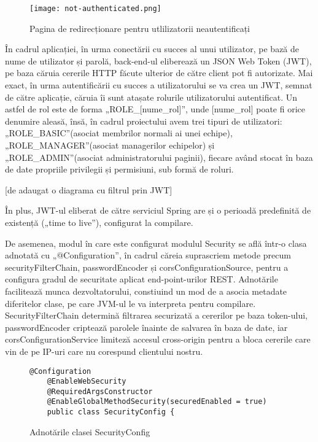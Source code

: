  \begin{figure}[ht]
	\centering
 	 \texttt{[image: not-authenticated.png]}
	\caption{Pagina de redirecționare pentru utlilizatorii neautentificați}
	\label{not-authenticated}
 \end{figure}

În cadrul aplicației, în urma conectării cu succes al unui utilizator, pe bază de nume de utilizator și parolă, back-end-ul eliberează un JSON Web Token (JWT), pe baza căruia cererile HTTP făcute ulterior de către client pot fi autorizate. Mai exact, în urma autentificării cu succes a utilizatorului se va crea un JWT, semnat de către aplicație, căruia îi sunt atașate rolurile utilizatorului autentificat. Un astfel de rol este de forma „ROLE_[nume_rol]”, unde [nume_rol] poate fi orice denumire aleasă, însă, în cadrul proiectului avem trei tipuri de utilizatori: „ROLE_BASIC”(asociat membrilor normali ai unei echipe), „ROLE_MANAGER”(asociat managerilor echipelor) și „ROLE_ADMIN”(asociat administratorului paginii), fiecare având stocat în baza de date propriile privilegii și permisiuni, sub formă de roluri.

[de adaugat o diagrama cu filtrul prin JWT]

În plus, JWT-ul eliberat de către serviciul Spring are și o perioadă predefinită de existență („time to live”), configurat la compilare.

De asemenea, modul în care este configurat modulul Security se află într-o clasa adnotată cu „@Configuration”, în cadrul căreia suprascriem metode precum securityFilterChain, passwordEncoder și corsConfigurationSource, pentru a configura gradul de securitate aplicat end-point-urilor REST. Adnotările facilitează munca dezvoltatorului, constiuind un mod de a asocia metadate diferitelor clase, pe care JVM-ul le va interpreta pentru compilare. SecurityFilterChain determină filtrarea securizată a cererilor pe baza token-ului, passwordEncoder criptează parolele înainte de salvarea în baza de date, iar corsConfigurationService limiteză accesul cross-origin pentru a bloca cererile care vin de pe IP-uri care nu corespund clientului nostru.

\begin{figure}[hbtp]
	\begin{lstlisting}[frame=single]
	@Configuration
	@EnableWebSecurity
	@RequiredArgsConstructor
	@EnableGlobalMethodSecurity(securedEnabled = true)
	public class SecurityConfig {
	\end{lstlisting}
	\caption{Adnotările clasei SecurityConfig}
\end{figure}

